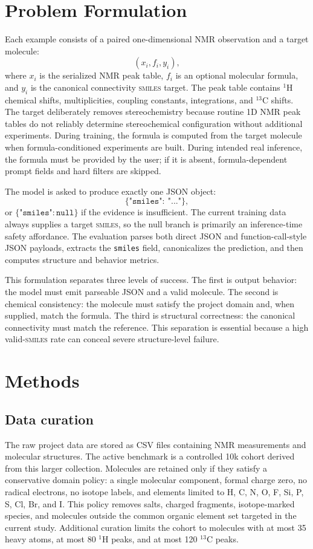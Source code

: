 \documentclass{article}
\newcommand{\smiles}{\textsc{smiles}}
\begin{document}
\section{Problem Formulation}

Each example consists of a paired one-dimensional NMR observation and a target molecule:
\[
  (x_i, f_i, y_i),
\]
where \(x_i\) is the serialized NMR peak table, \(f_i\) is an optional molecular formula, and \(y_i\) is the canonical connectivity \smiles{} target. The peak table contains \(^{1}\)H chemical shifts, multiplicities, coupling constants, integrations, and \(^{13}\)C shifts. The target deliberately removes stereochemistry because routine 1D NMR peak tables do not reliably determine stereochemical configuration without additional experiments. During training, the formula is computed from the target molecule when formula-conditioned experiments are built. During intended real inference, the formula must be provided by the user; if it is absent, formula-dependent prompt fields and hard filters are skipped.

The model is asked to produce exactly one JSON object:
\[
  \{\texttt{"smiles"}:\ \texttt{"..."}\},
\]
or \(\{\texttt{"smiles"}:\texttt{null}\}\) if the evidence is insufficient. The current training data always supplies a target \smiles{}, so the null branch is primarily an inference-time safety affordance. The evaluation parses both direct JSON and function-call-style JSON payloads, extracts the \texttt{smiles} field, canonicalizes the prediction, and then computes structure and behavior metrics.

This formulation separates three levels of success. The first is output behavior: the model must emit parseable JSON and a valid molecule. The second is chemical consistency: the molecule must satisfy the project domain and, when supplied, match the formula. The third is structural correctness: the canonical connectivity must match the reference. This separation is essential because a high valid-\smiles{} rate can conceal severe structure-level failure.

\section{Methods}

\subsection{Data curation}

The raw project data are stored as CSV files containing NMR measurements and molecular structures. The active benchmark is a controlled 10k cohort derived from this larger collection. Molecules are retained only if they satisfy a conservative domain policy: a single molecular component, formal charge zero, no radical electrons, no isotope labels, and elements limited to H, C, N, O, F, Si, P, S, Cl, Br, and I. This policy removes salts, charged fragments, isotope-marked species, and molecules outside the common organic element set targeted in the current study. Additional curation limits the cohort to molecules with at most 35 heavy atoms, at most 80 \(^{1}\)H peaks, and at most 120 \(^{13}\)C peaks.
\end{document}
